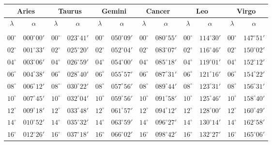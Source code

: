 \clearpage
\begin{table}[!h]
\vspace{0.25cm}
\centering
{\scriptsize \begin{tabular}{cc|cc|cc|cc|cc|cc}
\multicolumn{2}{c}{Aries}\vline & \multicolumn{2}{c}{Taurus} \vline& \multicolumn{2}{c}{Gemini} \vline& \multicolumn{2}{c}{Cancer}\vline &
\multicolumn{2}{c}{Leo}\vline & \multicolumn{2}{c}{Virgo}\\\hline
$\lambda$& $\alpha$& $\lambda$& $\alpha$& $\lambda$& $\alpha$& $\lambda$& $\alpha$& $\lambda$& $\alpha$& $\lambda$& $\alpha$\\\hline
&&&&&&&&&&&\\[-2ex]
$00^\circ$ & $000^\circ00'$ & $00^\circ$ & $023^\circ41'$ & $00^\circ$ & $050^\circ09'$ & $00^\circ$ & $080^\circ55'$ & $00^\circ$ & $114^\circ30'$ & $00^\circ$ & $147^\circ51'$\\
$02^\circ$ & $001^\circ33'$ & $02^\circ$ & $025^\circ20'$ & $02^\circ$ & $052^\circ04'$ & $02^\circ$ & $083^\circ07'$ & $02^\circ$ & $116^\circ46'$ & $02^\circ$ & $150^\circ02'$\\
$04^\circ$ & $003^\circ06'$ & $04^\circ$ & $026^\circ59'$ & $04^\circ$ & $054^\circ00'$ & $04^\circ$ & $085^\circ18'$ & $04^\circ$ & $119^\circ01'$ & $04^\circ$ & $152^\circ12'$\\
$06^\circ$ & $004^\circ38'$ & $06^\circ$ & $028^\circ40'$ & $06^\circ$ & $055^\circ57'$ & $06^\circ$ & $087^\circ31'$ & $06^\circ$ & $121^\circ16'$ & $06^\circ$ & $154^\circ22'$\\
$08^\circ$ & $006^\circ12'$ & $08^\circ$ & $030^\circ22'$ & $08^\circ$ & $057^\circ56'$ & $08^\circ$ & $089^\circ44'$ & $08^\circ$ & $123^\circ31'$ & $08^\circ$ & $156^\circ31'$\\
$10^\circ$ & $007^\circ45'$ & $10^\circ$ & $032^\circ04'$ & $10^\circ$ & $059^\circ56'$ & $10^\circ$ & $091^\circ58'$ & $10^\circ$ & $125^\circ46'$ & $10^\circ$ & $158^\circ40'$\\
$12^\circ$ & $009^\circ18'$ & $12^\circ$ & $033^\circ48'$ & $12^\circ$ & $061^\circ57'$ & $12^\circ$ & $094^\circ12'$ & $12^\circ$ & $128^\circ00'$ & $12^\circ$ & $160^\circ49'$\\
$14^\circ$ & $010^\circ52'$ & $14^\circ$ & $035^\circ32'$ & $14^\circ$ & $063^\circ59'$ & $14^\circ$ & $096^\circ27'$ & $14^\circ$ & $130^\circ14'$ & $14^\circ$ & $162^\circ58'$\\
$16^\circ$ & $012^\circ26'$ & $16^\circ$ & $037^\circ18'$ & $16^\circ$ & $066^\circ02'$ & $16^\circ$ & $098^\circ42'$ & $16^\circ$ & $132^\circ27'$ & $16^\circ$ & $165^\circ06'$\\

\end{tabular}}
\end{table}
